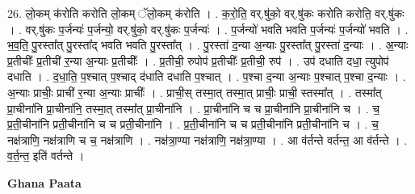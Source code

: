 \documentclass[17pt]{extarticle}
\begin{document}
26. लो॒कम् क॑रोति करोति लो॒कम् ॅलो॒कम् क॑रोति । . क॒रो॒ति॒ वर्.षु॑को॒ वर्.षु॑कः करोति करोति॒ वर्.षु॑कः । . वर्.षु॑कः प॒र्जन्यः॑ प॒र्जन्यो॒ वर्.षु॑को॒ वर्.षु॑कः प॒र्जन्यः॑ । . प॒र्जन्यो॑ भवति भवति प॒र्जन्यः॑ प॒र्जन्यो॑ भवति । . भ॒व॒ति॒ पु॒रस्ता᳚त् पु॒रस्ता᳚द् भवति भवति पु॒रस्ता᳚त् । . पु॒रस्ता॑ द॒न्या अ॒न्याः पु॒रस्ता᳚त् पु॒रस्ता॑ द॒न्याः । . अ॒न्याः प्र॒तीचीः᳚ प्र॒तीची॑ र॒न्या अ॒न्याः प्र॒तीचीः᳚ । . प्र॒तीची॒ रुपोप॑ प्र॒तीचीः᳚ प्र॒तीची॒ रुप॑ । . उप॑ दधाति दधा॒ त्युपोप॑ दधाति । . द॒धा॒ति॒ प॒श्चात् प॒श्चाद् द॑धाति दधाति प॒श्चात् । . प॒श्चा द॒न्या अ॒न्याः प॒श्चात् प॒श्चा द॒न्याः । . अ॒न्याः प्राचीः॒ प्राची॑ र॒न्या अ॒न्याः प्राचीः᳚ । . प्राची॒स् तस्मा॒त् तस्मा॒त् प्राचीः॒ प्राची॒ स्तस्मा᳚त् । . तस्मा᳚त् प्रा॒चीना॑नि प्रा॒चीना॑नि॒ तस्मा॒त् तस्मा᳚त् प्रा॒चीना॑नि । . प्रा॒चीना॑नि च च प्रा॒चीना॑नि प्रा॒चीना॑नि च । . च॒ प्र॒ती॒चीना॑नि प्रती॒चीना॑नि च च प्रती॒चीना॑नि । . प्र॒ती॒चीना॑नि च च प्रती॒चीना॑नि प्रती॒चीना॑नि च । . च॒ नक्ष॑त्राणि॒ नक्ष॑त्राणि च च॒ नक्ष॑त्राणि । . नक्ष॑त्रा॒ण्या नक्ष॑त्राणि॒ नक्ष॑त्रा॒ण्या । . आ व॑र्तन्ते वर्तन्त॒ आ व॑र्तन्ते । . व॒र्त॒न्त॒ इति॑ वर्तन्ते । \newline

\textbf{Ghana Paata } \newline
\end{document}
